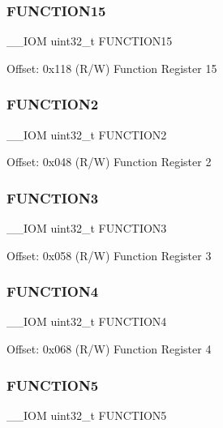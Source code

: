 \subsubsection{\texorpdfstring{FUNCTION15}{FUNCTION15}}
{\footnotesize\ttfamily \+\_\+\+\_\+\+I\+OM uint32\+\_\+t F\+U\+N\+C\+T\+I\+O\+N15}

Offset\+: 0x118 (R/W) Function Register 15 \mbox{\label{struct_d_w_t___type_a8ba3cc103077080ae3c0fc41e87d1197}} 
\subsubsection{\texorpdfstring{FUNCTION2}{FUNCTION2}}
{\footnotesize\ttfamily \+\_\+\+\_\+\+I\+OM uint32\+\_\+t F\+U\+N\+C\+T\+I\+O\+N2}

Offset\+: 0x048 (R/W) Function Register 2 \mbox{\label{struct_d_w_t___type_afbfaba1d10558329868c6c55f91f82df}} 
\subsubsection{\texorpdfstring{FUNCTION3}{FUNCTION3}}
{\footnotesize\ttfamily \+\_\+\+\_\+\+I\+OM uint32\+\_\+t F\+U\+N\+C\+T\+I\+O\+N3}

Offset\+: 0x058 (R/W) Function Register 3 \mbox{\label{struct_d_w_t___type_ac6e22e104dd39b27e256b2850de70521}} 
\subsubsection{\texorpdfstring{FUNCTION4}{FUNCTION4}}
{\footnotesize\ttfamily \+\_\+\+\_\+\+I\+OM uint32\+\_\+t F\+U\+N\+C\+T\+I\+O\+N4}

Offset\+: 0x068 (R/W) Function Register 4 \mbox{\label{struct_d_w_t___type_a9b7aee338904a0499cdfbc375a1e9f07}} 
\subsubsection{\texorpdfstring{FUNCTION5}{FUNCTION5}}
{\footnotesize\ttfamily \+\_\+\+\_\+\+I\+OM uint32\+\_\+t F\+U\+N\+C\+T\+I\+O\+N5}

